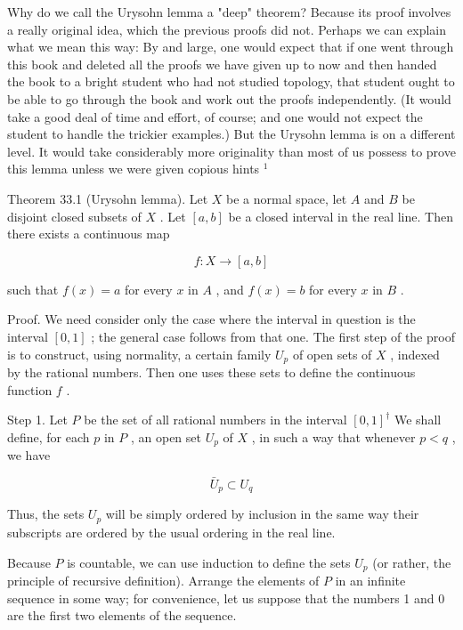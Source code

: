 Why do we call the Urysohn lemma a "deep" theorem? Because its proof involves a really original idea, which the previous proofs did not. Perhaps we can explain what we mean this way: By and large, one would expect that if one went through this book and deleted all the proofs we have given up to now and then handed the book to a bright student who had not studied topology, that student ought to be able to go through the book and work out the proofs independently. (It would take a good deal of time and effort, of course; and one would not expect the student to handle the trickier examples.) But the Urysohn lemma is on a different level. It would take considerably more originality than most of us possess to prove this lemma unless we were given copious hints \({}^{1}\)

Theorem 33.1 (Urysohn lemma). Let \(X\) be a normal space, let \(A\) and \(B\) be disjoint closed subsets of \(X\) . Let \(\left\lbrack  {a,b}\right\rbrack\) be a closed interval in the real line. Then there exists a continuous map

\[
f : X \rightarrow  \left\lbrack  {a,b}\right\rbrack
\]

such that \(f\left( x\right)  = a\) for every \(x\) in \(A\) , and \(f\left( x\right)  = b\) for every \(x\) in \(B\) .

Proof. We need consider only the case where the interval in question is the interval \(\left\lbrack  {0,1}\right\rbrack\) ; the general case follows from that one. The first step of the proof is to construct, using normality, a certain family \({U}_{p}\) of open sets of \(X\) , indexed by the rational numbers. Then one uses these sets to define the continuous function \(f\) .

Step 1. Let \(P\) be the set of all rational numbers in the interval \({\left\lbrack  0,1\right\rbrack  }^{ \dagger  }\) We shall define, for each \(p\) in \(P\) , an open set \({U}_{p}\) of \(X\) , in such a way that whenever \(p < q\) , we have

\[
{\bar{U}}_{p} \subset  {U}_{q}
\]

Thus, the sets \({U}_{p}\) will be simply ordered by inclusion in the same way their subscripts are ordered by the usual ordering in the real line.

Because \(P\) is countable, we can use induction to define the sets \({U}_{p}\) (or rather, the principle of recursive definition). Arrange the elements of \(P\) in an infinite sequence in some way; for convenience, let us suppose that the numbers 1 and 0 are the first two elements of the sequence.

